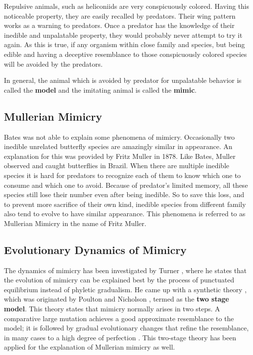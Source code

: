 \documentclass[letterpaper]{article}
\numberwithin{equation}{section}
\begin{document}
Repulsive animals, such as heliconiids are very conspicuously colored. Having this noticeable property, they are easily recalled by predators. Their wing pattern works as a warning to predators. Once a predator has the knowledge of their inedible and unpalatable property, they would probably never attempt to try it again. As this is true, if any organism within close family and species, but being edible and having a deceptive resemblance to those conspicuously colored species will be avoided by the predators. 

In general, the animal which is avoided by predator for unpalatable behavior is called the \textbf{model} and the imitating animal is called the \textbf{mimic}.

\subsection{Mullerian Mimicry}
\label{subsec:mullerian-mimicry}
Bates was not able to explain some phenomena of mimicry. Occasionally two inedible unrelated butterfly species are amazingly similar in appearance. An explanation for this was provided by Fritz Muller in 1878. Like Bates, Muller observed and caught butterflies in Brazil. When there are multiple inedible species it is hard for predators to recognize each of them to know which one to consume and which one to avoid. Because of predator's limited memory, all these species still lose their number even after being inedible. So to save this loss, and to prevent more sacrifice of their own kind, inedible species from different family also tend to evolve to have similar appearance. This phenomena is referred to as Mullerian Mimicry in the name of Fritz Muller.

\subsection{Evolutionary Dynamics of Mimicry}
\label{subsec:evolutionary-dynamics-of-mimicry}
The dynamics of mimicry has been investigated by Turner \citep{turner1988}, where he states that the evolution of mimicry can be explained best by the process of punctuated equilibrium instead of phyletic gradualism. He came up with a synthetic theory \citep{turner1988}, which was originated by Poulton \citep{poulton1912} and Nicholson \citep{nicholson1927}, termed as the \textbf{two stage model}. This theory states that mimicry normally arises in two steps. A comparative large mutation achieves a good approximate resemblance to the model; it is followed by gradual evolutionary changes that refine the resemblance, in many cases to a high degree of perfection \citep{sheppard1972} \citep{ford1964}. This two-stage theory has been applied for the explanation of Mullerian mimicry as well.
\end{document}
